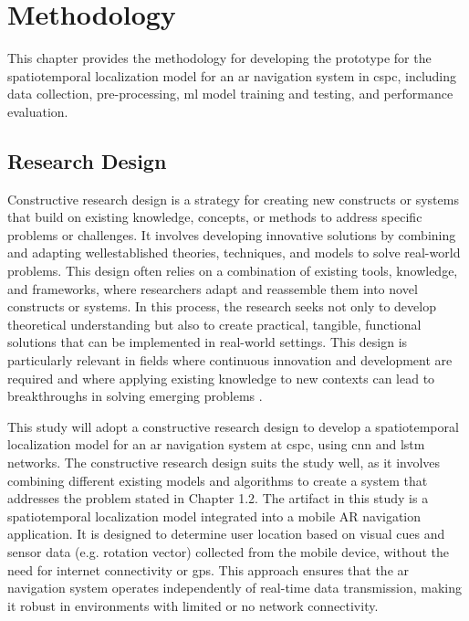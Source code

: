 
\chapter{Methodology}
\begin{refsection}

This chapter provides the methodology for developing the prototype for the spatiotemporal localization model for an \gls{ar} navigation system in \gls{cspc}, including data collection, pre-processing, \gls{ml} model training and testing, and performance evaluation.

\section{Research Design}

Constructive research design is a strategy for creating new constructs or systems that build on existing knowledge, concepts, or methods to address specific problems or challenges. It involves developing innovative solutions by combining and adapting well\-established theories, techniques, and models to solve real-world problems. This design often relies on a combination of existing tools, knowledge, and frameworks, where researchers adapt and reassemble them into novel constructs or systems. In this process, the research seeks not only to develop theoretical understanding but also to create practical, tangible, functional solutions that can be implemented in real-world settings. This design is particularly relevant in fields where continuous innovation and development are required and where applying existing knowledge to new contexts can lead to breakthroughs in solving emerging problems \cite{crnkovic2010}.

This study will adopt a constructive research design to develop a spatiotemporal localization model for an \gls{ar} navigation system at \gls{cspc}, using \gls{cnn} and \gls{lstm} networks. The constructive research design suits the study well, as it involves combining different existing models and algorithms to create a system that addresses the problem stated in Chapter 1.2. The artifact in this study is a spatiotemporal localization model integrated into a mobile AR navigation application. It is designed to determine user location based on visual cues and sensor data (e.g. rotation vector) collected from the mobile device, without the need for internet connectivity or \gls{gps}. This approach ensures that the \gls{ar} navigation system operates independently of real-time data transmission, making it robust in environments with limited or no network connectivity.


\end{refsection}
